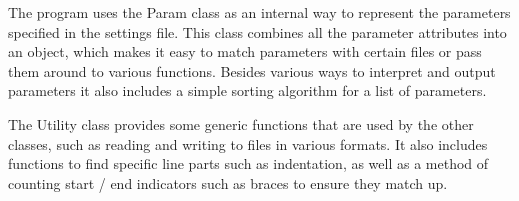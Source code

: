\documentclass{settings/TU_Delft_Report}
\begin{document}
\vsp The program uses the Param class as an internal way to represent the parameters specified in the settings file. This class combines all the parameter attributes into an object, which makes it easy to match parameters with certain files or pass them around to various functions. Besides various ways to interpret and output parameters it also includes a simple sorting algorithm for a list of parameters.

\vsp The Utility class provides some generic functions that are used by the other classes, such as reading and writing to files in various formats. It also includes functions to find specific line parts such as indentation, as well as a method of counting start / end indicators such as braces to ensure they match up.

\end{document}
